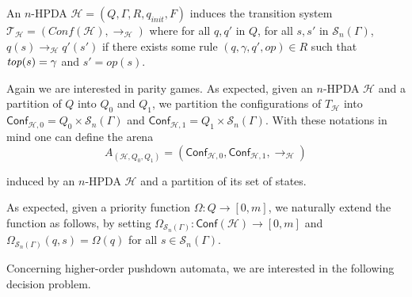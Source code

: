 \documentclass[a4paper,UKenglish,cleveref, autoref, thm-restate]{lipics-v2021}
\newcommand{\problemx}[3]{
	\vspace{0.2cm}
\par\noindent\underline{\sc#1}\par\nobreak\vskip.2\baselineskip
\begingroup\clubpenalty10000\widowpenalty10000
\setbox0\hbox{\bf INPUT:\ }\setbox1\hbox{\bf QUESTION:\ }
\dimen0=\wd0\ifnum\wd1>\dimen0\dimen0=\wd1\fi
\vskip-\parskip\noindent
\hbox to\dimen0{\box0\hfil}\hangindent\dimen0\hangafter1\ignorespaces#2\par
\vskip-\parskip\noindent
\hbox to\dimen0{\box1\hfil}\hangindent\dimen0\hangafter1\ignorespaces#3\par
\endgroup
	\vspace{-0.2cm}
}
\newcommand{\T}{\mathcal{T}}
\renewcommand{\H}{\mathcal{H}}
\newcommand{\Conf}{\mathsf{Conf}}
\newcommand{\win}{\textsc{Win}}
\begin{document}
An $n$-HPDA $\H=(Q, \Gamma, R, q_{init}, F)$
induces the transition system $\T_\H = (Conf(\mathcal{H}), \rightarrow_{\mathcal{H}})$
where
for all $q,q'$ in $Q$,
for all $s,s'$ in $\mathscr{S}_n(\Gamma)$,
$q(s) \rightarrow_{\mathcal{H}} q'(s')$ if
there exists some rule
$(q,\gamma,q',op) \in R$
such that
$\text{\textit{top}}(s) = \gamma$
and
$s' = op(s)$.

Again we are interested in parity games.
As expected, given an 
 $n$-HPDA $\mathcal{H}$
 and a partition of
$Q$ into $Q_0$ and $Q_1$,
we partition the configurations of
$T_{\mathcal{H}}$
into
$\Conf_{\mathcal{H},0}=Q_0\times \mathscr{S}_n(\Gamma)$
and
$\Conf_{\mathcal{H},1}=Q_1\times\mathscr{S}_n(\Gamma)$.
%
%
With these notations in mind one can define the arena
$$
A_{(\mathcal{H}, Q_0, Q_1)}
=
(\Conf_{\mathcal{H},0}, \Conf_{\mathcal{H},1}, \rightarrow_{\mathcal{H}})$$
\par\noindent\ignorespacesafterend
induced by an $n$-HPDA $\mathcal{H}$ and a partition of its set of states.


As expected, given a 
priority function $\Omega: Q \to [0, m]$,
we naturally extend the function
as follows,
by setting
$\Omega_{\mathscr{S}_n(\Gamma)}: \Conf(\mathcal{H}) \to [0, m]$
and
$\Omega_{\mathscr{S}_n(\Gamma)}(q, s) = \Omega(q)$
for all
$s \in \mathscr{S}_n(\Gamma)$.





Concerning higher-order pushdown automata, we are interested in the following decision problem. 

\end{document}
